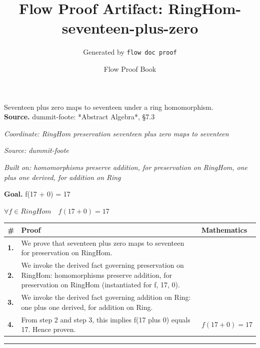\documentclass[11pt]{article}
\title{Flow Proof Artifact: RingHom-seventeen-plus-zero}
\author{Generated by \texttt{flow doc proof}}
\date{Flow Proof Book}
\theoremstyle{definition}
\begin{document}
\maketitle
Seventeen plus zero maps to seventeen under a ring homomorphism.\\[0.5em]
\textbf{Source.} dummit-foote: *Abstract Algebra*, §7.3\\[0.5em]
\bigskip
{}\par
\smallskip\noindent\textit{Coordinate: RingHom \cdot preservation \cdot seventeen plus zero maps to seventeen}\par
\smallskip\noindent\textit{Source: dummit-foote}\par
\smallskip\noindent\textit{Built on: homomorphisms preserve addition, for preservation on RingHom, one plus one derived, for addition on Ring}\par
\medskip
\noindent\textbf{Goal.} f(17 + 0) = 17\par
\noindent$\displaystyle \forall f \in RingHom\quad f(17 + 0) = 17$\par
\medskip
\noindent
\begin{tabular}{@{} >{\raggedright\arraybackslash}p{} >{\raggedright\arraybackslash}p{} >{\raggedleft\arraybackslash}p{} @{}}
\textbf{\#} & \textbf{Proof} & \textbf{Mathematics} \\
\midrule
\textbf{1.} & We prove that seventeen plus zero maps to seventeen for preservation on RingHom. & \\[0.45em]
\textbf{2.} & We invoke the derived fact governing preservation on RingHom: homomorphisms preserve addition, for preservation on RingHom (instantiated for f, 17, 0). & \\[0.45em]
\textbf{3.} & We invoke the derived fact governing addition on Ring: one plus one derived, for addition on Ring. & \\[0.45em]
\textbf{4.} & From step 2 and step 3, this implies f(17 plus 0) equals 17. Hence proven. & $\displaystyle f(17 + 0) = 17$ \\[0.45em]
\bottomrule
\end{tabular}
\label{thm:RingHom-preservation-seventeen_plus_zero_maps_to_seventeen}
\par\medskip\hrule
\end{document}
